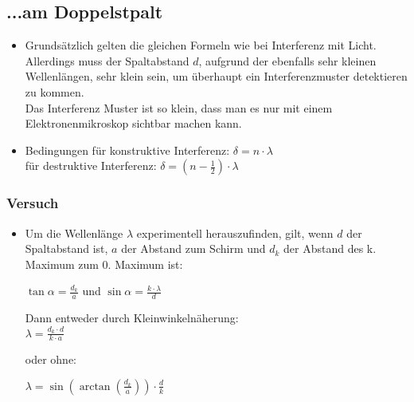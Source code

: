 \subsection{...am Doppelstpalt}
\begin{itemize}
\item Grundsätzlich gelten die gleichen Formeln wie bei Interferenz mit Licht. Allerdings muss der Spaltabstand $d$, aufgrund der ebenfalls sehr kleinen Wellenlängen, sehr klein sein, um überhaupt ein Interferenzmuster detektieren zu kommen.\\
Das Interferenz Muster ist so klein, dass man es nur mit einem Elektronenmikroskop sichtbar machen kann.
\item Bedingungen für konstruktive Interferenz: $\delta = n \cdot \lambda$\\
für destruktive Interferenz: $\delta = (n-\frac{1}{2}) \cdot \lambda$
\end{itemize}

\subsubsection{Versuch}
\begin{itemize}
\item Um die Wellenlänge $\lambda$ experimentell herauszufinden, gilt, wenn $d$ der Spaltabstand ist, $a$ der Abstand zum Schirm und $d_k$ der Abstand des k. Maximum zum 0. Maximum ist:

$\tan{\alpha}=\frac{d_k}{a}$ und $\sin{\alpha}=\frac{k \cdot\lambda}{d}$

Dann entweder durch Kleinwinkelnäherung:\\
\Large $\lambda = \frac{d_k \cdot d}{k \cdot a}$

\normalsize oder ohne:

\Large $\lambda = \sin(\arctan(\frac{d_k}{a})) \cdot \frac{d}{k}$
\end{itemize}

